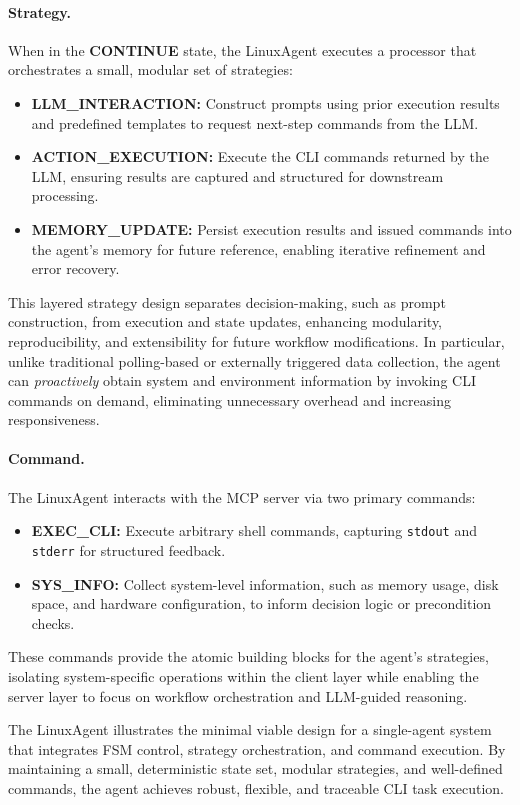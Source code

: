 \documentclass[10pt]{article} %
\begin{document}
\paragraph{Strategy.}  
When in the \textbf{CONTINUE} state, the LinuxAgent executes a processor that orchestrates a small, modular set of strategies:  
\begin{itemize}
    \item \textbf{LLM\_INTERACTION:} Construct prompts using prior execution results and predefined templates to request next-step commands from the LLM.  
    \item \textbf{ACTION\_EXECUTION:} Execute the CLI commands returned by the LLM, ensuring results are captured and structured for downstream processing.  
    \item \textbf{MEMORY\_UPDATE:} Persist execution results and issued commands into the agent's memory for future reference, enabling iterative refinement and error recovery.  
\end{itemize}  
This layered strategy design separates decision-making, such as prompt construction, from execution and state updates, enhancing modularity, reproducibility, and extensibility for future workflow modifications. In particular, unlike traditional polling-based or externally triggered data collection, the agent can \emph{proactively} obtain system and environment information by invoking CLI commands on demand, eliminating unnecessary overhead and increasing responsiveness.


\paragraph{Command.}  
The LinuxAgent interacts with the MCP server via two primary commands:  
\begin{itemize}
    \item \textbf{EXEC\_CLI:} Execute arbitrary shell commands, capturing \texttt{stdout} and \texttt{stderr} for structured feedback.  
    \item \textbf{SYS\_INFO:} Collect system-level information, such as memory usage, disk space, and hardware configuration, to inform decision logic or precondition checks.  
\end{itemize}  
These commands provide the atomic building blocks for the agent's strategies, isolating system-specific operations within the client layer while enabling the server layer to focus on workflow orchestration and LLM-guided reasoning.

The LinuxAgent illustrates the minimal viable design for a single-agent system that integrates FSM control, strategy orchestration, and command execution. By maintaining a small, deterministic state set, modular strategies, and well-defined commands, the agent achieves robust, flexible, and traceable CLI task execution.
\end{document}
